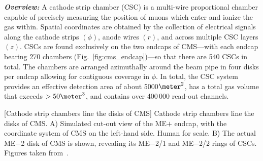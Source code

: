 \textit{\textbf{Overview:}}
A cathode strip chamber (CSC) is a multi-wire proportional chamber capable of precisely measuring the position of muons which enter and ionize the gas within.
Spatial coordinates are obtained by the collection of electrical signals along the cathode strips $(\phi)$, anode wires $(r)$, and across multiple CSC layers $(z)$.
CSCs are found exclusively on the two endcaps of CMS---with each endcap bearing 270 chambers (Fig.~\ref{fig:cms_endcap})---so that there are 540 CSCs in total.
The chambers are arranged azimuthally around the beam pipe in four disks per endcap allowing for contiguous coverage in $\phi$.
In total, the CSC system provides an effective detection area of about 5000$\meter^2$, has a total gas volume that exceeds $> 50\meter^{3}$, and contains over 400\,000 read-out channels.
\begin{multiFigure}
    \centering
        [Cathode strip chambers line the disks of CMS]
        {Cathode strip chambers line the disks of CMS.
        \;A) Simulated cut-out view of the ME$+$ endcap, with the coordinate system of CMS on the left-hand side.
        Human for scale.
        \;B) The actual ME$-$2 disk of CMS is shown, revealing its ME$-$2/1 and ME$-$2/2 rings of CSCs.
        Figures taken from~\cite{collaboration_cms_2008}.
        }
    \label{fig:cms_endcap}
\end{multiFigure}

